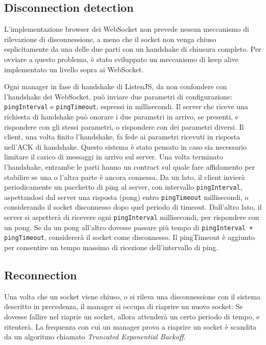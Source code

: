 \documentclass[12pt,a4paper,openright,twoside]{report}
\begin{document}
\subsection{Disconnection detection}

L'implementazione browser dei WebSocket non prevede nessun meccanismo di rilevazione di disconnessione, a meno che il socket non venga chiuso esplicitamente da una delle due parti con un handshake di chiusura completo. Per ovviare a questo problema, è stato sviluppato un meccanismo di keep alive implementato un livello sopra ai WebSocket.

\bigskip

Ogni manager in fase di handshake di ListenJS, da non confondere con l'handshake dei WebSocket, può inviare due parametri di configurazione: \lstinline{pingInterval} e \lstinline{pingTimeout}, espressi in millisecondi. Il server che riceve una richiesta di handshake può onorare i due parametri in arrivo, se presenti, e rispondere con gli stessi parametri, o rispondere con dei parametri diversi. Il client, una volta finito l'handshake, fa fede ai parametri ricevuti in risposta nell'ACK di handshake. Questo sistema è stato pensato in caso sia necessario limitare il carico di messaggi in arrivo sul server.
Una volta terminato l'handshake, entrambe le parti hanno un contract sul quale fare affidamento per stabilire se una o l'altra parte è ancora connessa.
Da un lato, il client invierà periodicamente un pacchetto di ping al server, con intervallo \lstinline{pingInterval}, aspettandosi dal server una risposta (pong) entro \lstinline{pingTimeout} millisecondi, o considerando il socket disconnesso dopo quel periodo di timeout.
Dall'altro lato, il server si aspetterà di ricevere ogni \lstinline{pingInterval} millisecondi, per rispondere con un pong. Se da un pong all'altro dovesse passare più tempo di \lstinline{pingInterval + pingTimeout}, considererà il socket come disconnesso. Il pingTimeout è aggiunto per consentire un tempo massimo di ricezione dell'intervallo di ping.

\subsection{Reconnection}
Una volta che un socket viene chiuso, o si rileva una disconnessione con il sistema descritto in precedenza, il manager si occupa di riaprire un nuovo socket. Se dovesse fallire nel riaprie un socket, allora attenderà un certo periodo di tempo, e ritenterà. La frequenza con cui un manager prova a riaprire un socket è scandita da un algoritmo chiamato \textit{Truncated Exponential Backoff}.
\end{document}
